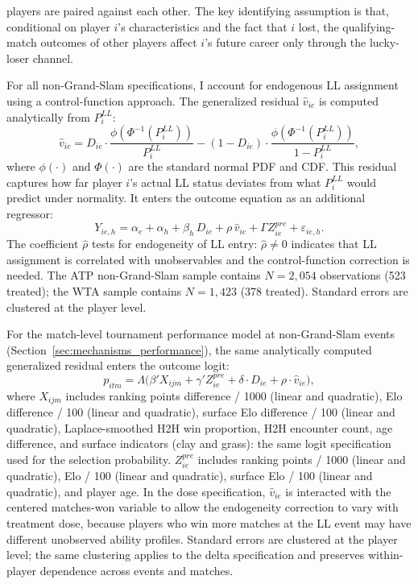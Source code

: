 players are paired against each other. The key identifying assumption is that, conditional on player $i$'s characteristics and the fact that $i$ lost, the qualifying-match outcomes of other players affect $i$'s future career only through the lucky-loser channel.

For all non-Grand-Slam specifications, I account for endogenous LL assignment using a control-function approach. The generalized residual $\hat{v}_{ie}$ is computed analytically from $P_i^{LL}$:
\[
\hat{v}_{ie} = D_{ie} \cdot \frac{\phi(\Phi^{-1}(P_i^{LL}))}{P_i^{LL}} - (1 - D_{ie}) \cdot \frac{\phi(\Phi^{-1}(P_i^{LL}))}{1 - P_i^{LL}},
\]
where $\phi(\cdot)$ and $\Phi(\cdot)$ are the standard normal PDF and CDF. This residual captures how far player $i$'s actual LL status deviates from what $P_i^{LL}$ would predict under normality. It enters the outcome equation as an additional regressor:
\begin{equation}
\label{eq:cf_dynamic}
Y_{ie,h} = \alpha_e + \alpha_h + \beta_h \, D_{ie} + \rho \, \hat{v}_{ie} + \Gamma Z^{pre}_{ie} + \varepsilon_{ie,h}.
\end{equation}
The coefficient $\hat{\rho}$ tests for endogeneity of LL entry: $\hat{\rho} \neq 0$ indicates that LL assignment is correlated with unobservables and the control-function correction is needed. The ATP non-Grand-Slam sample contains $N = 2{,}054$ observations (523 treated); the WTA sample contains $N = 1{,}423$ (378 treated). Standard errors are clustered at the player level.

For the match-level tournament performance model at non-Grand-Slam events (Section~\ref{sec:mechanisms_performance}), the same analytically computed generalized residual enters the outcome logit:
\begin{equation}
\label{eq:match_logit_cf}
p_{itm} = \Lambda\bigl(\beta' X_{ijm} + \gamma' Z^{pre}_{ie} + \delta \cdot D_{ie} + \rho \cdot \hat{v}_{ie}\bigr),
\end{equation}
where $X_{ijm}$ includes ranking points difference / 1000 (linear and quadratic), Elo difference / 100 (linear and quadratic), surface Elo difference / 100 (linear and quadratic), Laplace-smoothed H2H win proportion, H2H encounter count, age difference, and surface indicators (clay and grass): the same logit specification used for the selection probability. $Z^{pre}_{ie}$ includes ranking points / 1000 (linear and quadratic), Elo / 100 (linear and quadratic), surface Elo / 100 (linear and quadratic), and player age. In the dose specification, $\hat{v}_{ie}$ is interacted with the centered matches-won variable to allow the endogeneity correction to vary with treatment dose, because players who win more matches at the LL event may have different unobserved ability profiles. Standard errors are clustered at the player level; the same clustering applies to the delta specification and preserves within-player dependence across events and matches.
